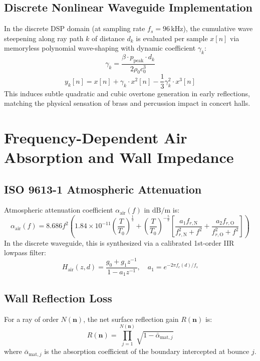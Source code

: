\documentclass[11pt,a4paper]{article}
\begin{document}
\subsection{Discrete Nonlinear Waveguide Implementation}
In the discrete DSP domain (at sampling rate $f_s = 96\,\text{kHz}$), the cumulative wave steepening along ray path $k$ of distance $d_k$ is evaluated per sample $x[n]$ via memoryless polynomial wave-shaping with dynamic coefficient $\gamma_k$:
\begin{equation}
\gamma_k = \frac{\beta \cdot p_{\text{peak}} \cdot d_k}{2 \rho_0 c_0^3}
\end{equation}
\begin{equation}
y_k[n] = x[n] + \gamma_k \cdot x^2[n] - \frac{1}{3} \gamma_k^2 \cdot x^3[n]
\end{equation}
This induces subtle quadratic and cubic overtone generation in early reflections, matching the physical sensation of brass and percussion impact in concert halls.

\section{Frequency-Dependent Air Absorption and Wall Impedance}

\subsection{ISO 9613-1 Atmospheric Attenuation}
Atmospheric attenuation coefficient $\alpha_{\text{air}}(f)$ in $\text{dB/m}$ is:
\begin{equation}
\alpha_{\text{air}}(f) = 8.686 f^2 \left( 1.84 \times 10^{-11} \left(\frac{T}{T_0}\right)^{\frac{1}{2}} + \left(\frac{T}{T_0}\right)^{-\frac{5}{2}} \left[ \frac{a_1 f_{r,\text{N}}}{f_{r,\text{N}}^2 + f^2} + \frac{a_2 f_{r,\text{O}}}{f_{r,\text{O}}^2 + f^2} \right] \right)
\end{equation}
In the discrete waveguide, this is synthesized via a calibrated 1st-order IIR lowpass filter:
\begin{equation}
H_{\text{air}}(z, d) = \frac{g_0 + g_1 z^{-1}}{1 - a_1 z^{-1}}, \quad a_1 = e^{-2\pi f_c(d) / f_s}
\end{equation}

\subsection{Wall Reflection Loss}
For a ray of order $N(\mathbf{n})$, the net surface reflection gain $R(\mathbf{n})$ is:
\begin{equation}
R(\mathbf{n}) = \prod_{j=1}^{N(\mathbf{n})} \sqrt{1 - \bar{\alpha}_{\text{mat}, j}}
\end{equation}
where $\bar{\alpha}_{\text{mat}, j}$ is the absorption coefficient of the boundary intercepted at bounce $j$.
\end{document}
